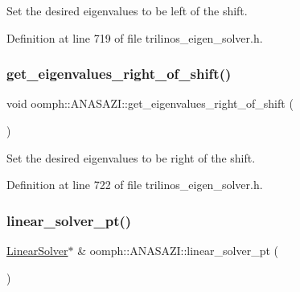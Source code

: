 Set the desired eigenvalues to be left of the shift. 



Definition at line 719 of file trilinos\+\_\+eigen\+\_\+solver.\+h.

\mbox{\label{classoomph_1_1ANASAZI_a1fba291e41996df19379a383befaa4f9}} 
\subsubsection{\texorpdfstring{get\+\_\+eigenvalues\+\_\+right\+\_\+of\+\_\+shift()}{get\_eigenvalues\_right\_of\_shift()}}
{\footnotesize\ttfamily void oomph\+::\+A\+N\+A\+S\+A\+Z\+I\+::get\+\_\+eigenvalues\+\_\+right\+\_\+of\+\_\+shift (\begin{DoxyParamCaption}{ }\end{DoxyParamCaption})\hspace{0.3cm}{\ttfamily [inline]}}



Set the desired eigenvalues to be right of the shift. 



Definition at line 722 of file trilinos\+\_\+eigen\+\_\+solver.\+h.

\mbox{\label{classoomph_1_1ANASAZI_aaaab3d8263b5bdf21eef4aecdc3273c7}} 
\subsubsection{\texorpdfstring{linear\+\_\+solver\+\_\+pt()}{linear\_solver\_pt()}\hspace{0.1cm}{\footnotesize\ttfamily [1/2]}}
{\footnotesize\ttfamily \hyperlink{classoomph_1_1LinearSolver}{Linear\+Solver}$\ast$ \& oomph\+::\+A\+N\+A\+S\+A\+Z\+I\+::linear\+\_\+solver\+\_\+pt (\begin{DoxyParamCaption}{ }\end{DoxyParamCaption})\hspace{0.3cm}{\ttfamily [inline]}}



